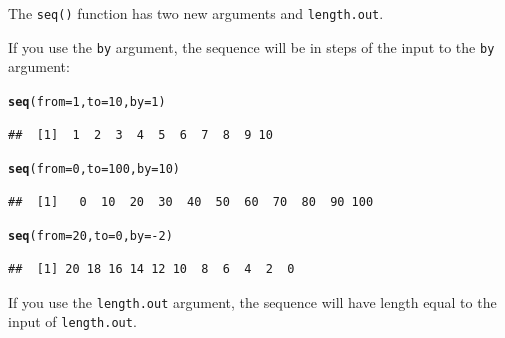 \documentclass{tufte-book}\usepackage[]{graphicx}\usepackage[]{color}
\makeatletter
\newcommand{\hlnum}[1]{\textcolor[rgb]{0.686,0.059,0.569}{#1}}%
\newcommand{\hlopt}[1]{\textcolor[rgb]{0,0,0}{#1}}%
\newcommand{\hlstd}[1]{\textcolor[rgb]{0.345,0.345,0.345}{#1}}%
\newcommand{\hlkwc}[1]{\textcolor[rgb]{0.333,0.667,0.333}{#1}}%
\newcommand{\hlkwd}[1]{\textcolor[rgb]{0.737,0.353,0.396}{\textbf{#1}}}%
\newenvironment{kframe}{%
 \def\at@end@of@kframe{}%
 \ifinner\ifhmode%
  \def\at@end@of@kframe{\end{minipage}}%
  \begin{minipage}{\columnwidth}%
 \fi\fi%
 \def\FrameCommand##1{\hskip\@totalleftmargin \hskip-\fboxsep
 \colorbox{shadecolor}{##1}\hskip-\fboxsep
     \hskip-\linewidth \hskip-\@totalleftmargin \hskip\columnwidth}%
 \MakeFramed {\advance\hsize-\width
   \@totalleftmargin\z@ \linewidth\hsize
   \@setminipage}}%
 {\par\unskip\endMakeFramed%
 \at@end@of@kframe}
\newenvironment{knitrout}{}{} %
\makeatother
\begin{document}

The \texttt{seq()} function has two new arguments  and \texttt{length.out}.

If you use the \texttt{by} argument, the sequence will be in steps of the input to the \texttt{by} argument:


\begin{knitrout}
\color{fgcolor}\begin{kframe}
\begin{alltt}
\hlkwd{seq}\hlstd{(}\hlkwc{from} \hlstd{=} \hlnum{1}\hlstd{,} \hlkwc{to} \hlstd{=} \hlnum{10}\hlstd{,} \hlkwc{by} \hlstd{=} \hlnum{1}\hlstd{)}
\end{alltt}
\begin{verbatim}
##  [1]  1  2  3  4  5  6  7  8  9 10
\end{verbatim}
\begin{alltt}
\hlkwd{seq}\hlstd{(}\hlkwc{from} \hlstd{=} \hlnum{0}\hlstd{,} \hlkwc{to} \hlstd{=} \hlnum{100}\hlstd{,} \hlkwc{by} \hlstd{=} \hlnum{10}\hlstd{)}
\end{alltt}
\begin{verbatim}
##  [1]   0  10  20  30  40  50  60  70  80  90 100
\end{verbatim}
\begin{alltt}
\hlkwd{seq}\hlstd{(}\hlkwc{from} \hlstd{=} \hlnum{20}\hlstd{,} \hlkwc{to} \hlstd{=} \hlnum{0}\hlstd{,} \hlkwc{by} \hlstd{=} \hlopt{-}\hlnum{2}\hlstd{)}
\end{alltt}
\begin{verbatim}
##  [1] 20 18 16 14 12 10  8  6  4  2  0
\end{verbatim}
\end{kframe}
\end{knitrout}


If you use the \texttt{length.out} argument, the sequence will have length equal to the input of \texttt{length.out}.
\end{document}
